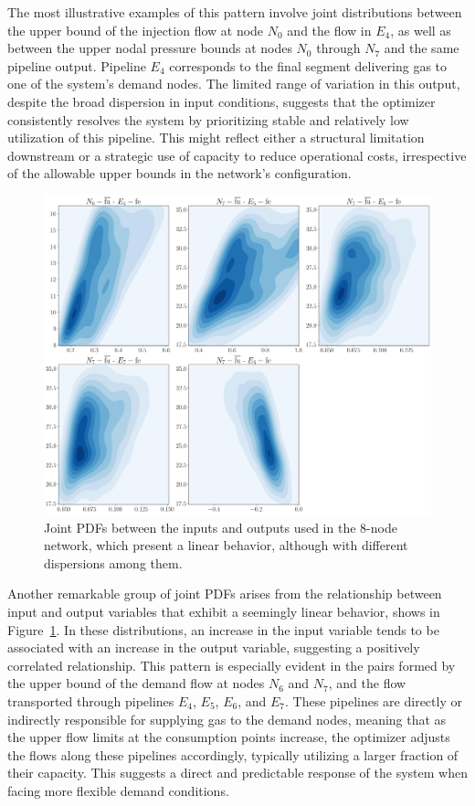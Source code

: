The most illustrative examples of this pattern involve joint distributions between the upper bound of the injection flow at node $N_0$ and the flow in $E_4$, as well as between the upper nodal pressure bounds at nodes $N_0$ through $N_7$ and the same pipeline output. Pipeline $E_4$ corresponds to the final segment delivering gas to one of the system’s demand nodes. The limited range of variation in this output, despite the broad dispersion in input conditions, suggests that the optimizer consistently resolves the system by prioritizing stable and relatively low utilization of this pipeline. This might reflect either a structural limitation downstream or a strategic use of capacity to reduce operational costs, irrespective of the allowable upper bounds in the network's configuration.


\begin{figure}
    \begin{center}
        \includegraphics[width=.7\textwidth]{figures/Chapter_NonLinealCensnet/inputs_outputs_2.png}
    \end{center}
    \caption{Joint PDFs between the inputs and outputs used in the 8-node network, which present a linear behavior, although with different dispersions among them. }\label{fig:joint_distributions_inputs_outputs_2}
\end{figure}
 

Another remarkable group of joint PDFs arises from the relationship between input and output variables that exhibit a seemingly linear behavior, shows in Figure~\cref{fig:joint_distributions_inputs_outputs_2}. In these distributions, an increase in the input variable tends to be associated with an increase in the output variable, suggesting a positively correlated relationship. This pattern is especially evident in the pairs formed by the upper bound of the demand flow at nodes $N_6$ and $N_7$, and the flow transported through pipelines $E_4$, $E_5$, $E_6$, and $E_7$. These pipelines are directly or indirectly responsible for supplying gas to the demand nodes, meaning that as the upper flow limits at the consumption points increase, the optimizer adjusts the flows along these pipelines accordingly, typically utilizing a larger fraction of their capacity. This suggests a direct and predictable response of the system when facing more flexible demand conditions.

